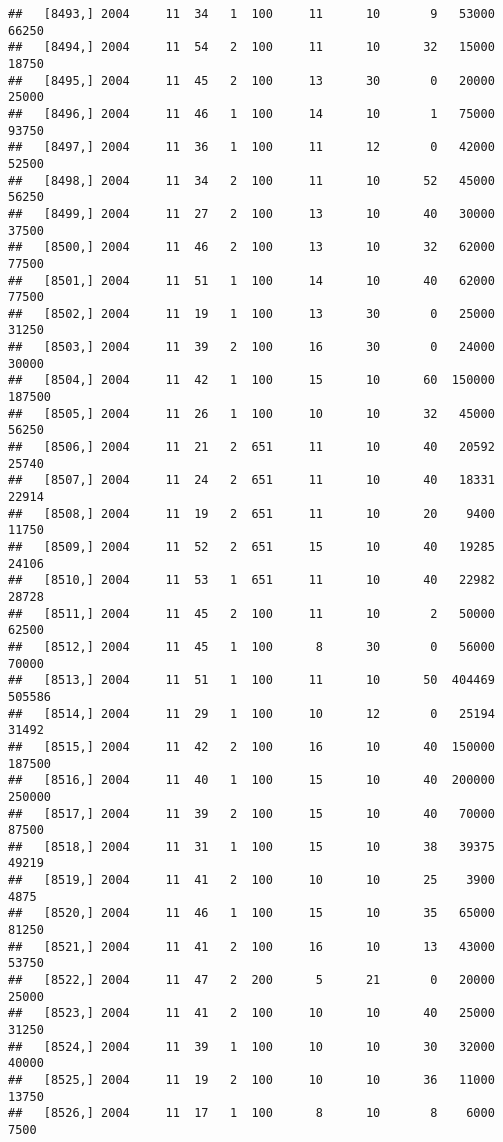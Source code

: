 \documentclass{article}\usepackage[]{graphicx}\usepackage[]{color}
\makeatletter
\newenvironment{kframe}{%
 \def\at@end@of@kframe{}%
 \ifinner\ifhmode%
  \def\at@end@of@kframe{\end{minipage}}%
  \begin{minipage}{\columnwidth}%
 \fi\fi%
 \def\FrameCommand##1{\hskip\@totalleftmargin \hskip-\fboxsep
 \colorbox{shadecolor}{##1}\hskip-\fboxsep
     \hskip-\linewidth \hskip-\@totalleftmargin \hskip\columnwidth}%
 \MakeFramed {\advance\hsize-\width
   \@totalleftmargin\z@ \linewidth\hsize
   \@setminipage}}%
 {\par\unskip\endMakeFramed%
 \at@end@of@kframe}
\newenvironment{knitrout}{}{} %
\makeatother
\begin{document}
\begin{knitrout}
\begin{kframe}
\begin{verbatim}
##   [8493,] 2004     11  34   1  100     11      10       9   53000   66250
##   [8494,] 2004     11  54   2  100     11      10      32   15000   18750
##   [8495,] 2004     11  45   2  100     13      30       0   20000   25000
##   [8496,] 2004     11  46   1  100     14      10       1   75000   93750
##   [8497,] 2004     11  36   1  100     11      12       0   42000   52500
##   [8498,] 2004     11  34   2  100     11      10      52   45000   56250
##   [8499,] 2004     11  27   2  100     13      10      40   30000   37500
##   [8500,] 2004     11  46   2  100     13      10      32   62000   77500
##   [8501,] 2004     11  51   1  100     14      10      40   62000   77500
##   [8502,] 2004     11  19   1  100     13      30       0   25000   31250
##   [8503,] 2004     11  39   2  100     16      30       0   24000   30000
##   [8504,] 2004     11  42   1  100     15      10      60  150000  187500
##   [8505,] 2004     11  26   1  100     10      10      32   45000   56250
##   [8506,] 2004     11  21   2  651     11      10      40   20592   25740
##   [8507,] 2004     11  24   2  651     11      10      40   18331   22914
##   [8508,] 2004     11  19   2  651     11      10      20    9400   11750
##   [8509,] 2004     11  52   2  651     15      10      40   19285   24106
##   [8510,] 2004     11  53   1  651     11      10      40   22982   28728
##   [8511,] 2004     11  45   2  100     11      10       2   50000   62500
##   [8512,] 2004     11  45   1  100      8      30       0   56000   70000
##   [8513,] 2004     11  51   1  100     11      10      50  404469  505586
##   [8514,] 2004     11  29   1  100     10      12       0   25194   31492
##   [8515,] 2004     11  42   2  100     16      10      40  150000  187500
##   [8516,] 2004     11  40   1  100     15      10      40  200000  250000
##   [8517,] 2004     11  39   2  100     15      10      40   70000   87500
##   [8518,] 2004     11  31   1  100     15      10      38   39375   49219
##   [8519,] 2004     11  41   2  100     10      10      25    3900    4875
##   [8520,] 2004     11  46   1  100     15      10      35   65000   81250
##   [8521,] 2004     11  41   2  100     16      10      13   43000   53750
##   [8522,] 2004     11  47   2  200      5      21       0   20000   25000
##   [8523,] 2004     11  41   2  100     10      10      40   25000   31250
##   [8524,] 2004     11  39   1  100     10      10      30   32000   40000
##   [8525,] 2004     11  19   2  100     10      10      36   11000   13750
##   [8526,] 2004     11  17   1  100      8      10       8    6000    7500

\end{verbatim}
\end{kframe}
\end{knitrout}
\end{document}
